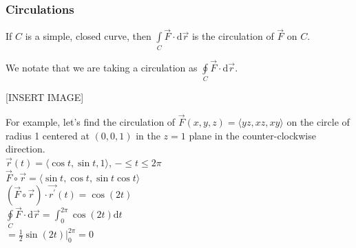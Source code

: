 \subsubsection{Circulations}
\begin{definition}
	If $C$ is a simple, closed curve, then $\int\limits_{C}{\vec{F} \cdot \mathrm{d}\vec{r}}$ is the circulation of $\vec{F}$ on $C$.
\end{definition}
\noindent
We notate that we are taking a circulation as $\oint\limits_{C}{\vec{F} \cdot \mathrm{d}\vec{r}}$.

[INSERT IMAGE]

\noindent
For example, let's find the circulation of $\vec{F}(x,y,z) = \langle yz, xz, xy \rangle$ on the circle of radius 1 centered at $(0,0,1)$ in the $z = 1$ plane in the counter-clockwise direction.\\
\indent
$\vec{r}(t) = \langle \cos{t}, \sin{t}, 1 \rangle$, $- \leq t \leq 2\pi$\\
\indent
$\vec{F}\circ\vec{r} = \langle \sin{t}, \cos{t}, \sin{t}\cos{t} \rangle$\\
\indent
$\left(\vec{F}\circ\vec{r}\right) \cdot \vec{r^\prime}(t) = \cos{(2t)}$\\
\indent
$\oint\limits_{C}{\vec{F}\cdot\mathrm{d}\vec{r}} = \int_{0}^{2\pi}{\cos{(2t)}\mathrm{d}t}$\\
\indent
$= \frac{1}{2}\sin{(2t)}\rvert_{0}^{2\pi} = 0$\\